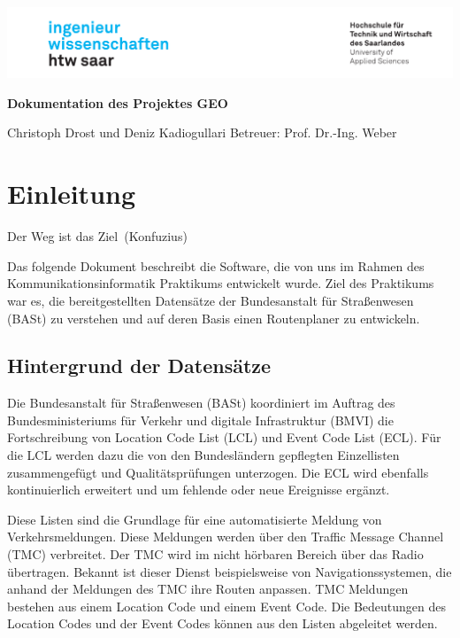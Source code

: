 \documentclass[12pt, a4paper, ngerman]{article}
\begin{document}
\begin{titlepage}
\includegraphics[width=\linewidth]{Grafiken/htwsaar_Logo_inwi_head_VF_4C_crop}
  \begin{center}
    \large  
    \hfill
    \vfill
    \begingroup
      \Large\bfseries Dokumentation des Projektes GEO  \\ \bigskip
    \endgroup

  \vfill
  Christoph Drost und Deniz Kadiogullari
  \vfill
  Betreuer: Prof. Dr.-Ing. Weber \\
\vfill                      

    \end{center}       
\end{titlepage}   


\tableofcontents 
\newpage

 
\section{Einleitung}
\glqq Der Weg ist das Ziel\grqq~(Konfuzius) \bigskip

Das folgende Dokument beschreibt die Software, die von uns im Rahmen des Kommunikationsinformatik Praktikums entwickelt wurde. Ziel des Praktikums war es, die bereitgestellten Datensätze der Bundesanstalt für Straßenwesen (BASt) zu verstehen und auf deren Basis einen Routenplaner zu entwickeln. 

\subsection{Hintergrund der Datensätze}
Die Bundesanstalt für Straßenwesen (BASt) koordiniert im Auftrag des Bundesministeriums für Verkehr und digitale Infrastruktur (BMVI) die Fortschreibung von Location Code List (LCL)  und Event Code List (ECL). Für die LCL werden dazu die von den Bundesländern gepflegten Einzellisten zusammengefügt und Qualitätsprüfungen unterzogen. Die ECL wird ebenfalls kontinuierlich erweitert und um fehlende oder neue Ereignisse ergänzt.

Diese Listen sind die Grundlage für eine automatisierte Meldung von Verkehrsmeldungen. Diese Meldungen werden über den Traffic Message Channel (TMC) verbreitet. Der TMC wird im nicht hörbaren Bereich über das Radio übertragen. Bekannt ist dieser Dienst beispielsweise von Navigationssystemen, die anhand der Meldungen des TMC ihre Routen anpassen. TMC Meldungen bestehen aus einem Location Code und einem Event Code. Die Bedeutungen des Location Codes und der Event Codes können aus den Listen abgeleitet werden.
\end{document}

